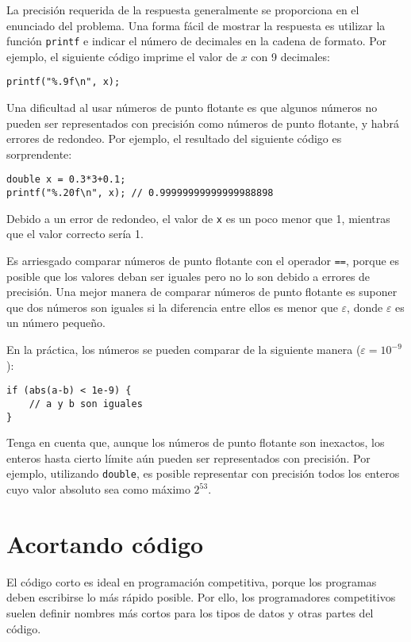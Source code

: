 La precisión requerida de la respuesta
generalmente se proporciona en el enunciado del problema.
Una forma fácil de mostrar la respuesta es utilizar
la función \texttt{printf}
e indicar el número de decimales
en la cadena de formato.
Por ejemplo, el siguiente código imprime
el valor de $x$ con 9 decimales:

\begin{lstlisting}
printf("%.9f\n", x);
\end{lstlisting}

Una dificultad al usar números de punto flotante
es que algunos números no pueden ser representados
con precisión como números de punto flotante,
y habrá errores de redondeo.
Por ejemplo, el resultado del siguiente código
es sorprendente:

\begin{lstlisting}
double x = 0.3*3+0.1;
printf("%.20f\n", x); // 0.99999999999999988898
\end{lstlisting}

Debido a un error de redondeo,
el valor de \texttt{x} es un poco menor que 1,
mientras que el valor correcto sería 1.

Es arriesgado comparar números de punto flotante
con el operador \texttt{==},
porque es posible que los valores deban ser
iguales pero no lo son debido a errores de precisión.
Una mejor manera de comparar números de punto flotante
es suponer que dos números son iguales
si la diferencia entre ellos es menor que $\varepsilon$,
donde $\varepsilon$ es un número pequeño.

En la práctica, los números se pueden comparar
de la siguiente manera ($\varepsilon=10^{-9}$):

\begin{lstlisting}
if (abs(a-b) < 1e-9) {
    // a y b son iguales
}
\end{lstlisting}

Tenga en cuenta que, aunque los números de punto flotante son inexactos,
los enteros hasta cierto límite aún pueden ser
representados con precisión.
Por ejemplo, utilizando \texttt{double},
es posible representar con precisión todos
los enteros cuyo valor absoluto sea como máximo $2^{53}$.

\section{Acortando código}

El código corto es ideal en programación competitiva,
porque los programas deben escribirse
lo más rápido posible.
Por ello, los programadores competitivos suelen definir
nombres más cortos para los tipos de datos y otras partes del código.

